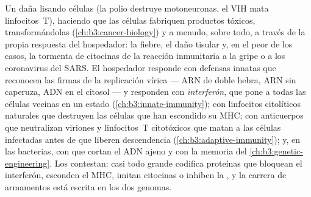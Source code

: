 \begin{proposition}\label{prop:b3:virology:pathogenesis}
Un  daña lisando células (la polio destruye motoneuronas, el VIH
mata linfocitos~T), haciendo que las células fabriquen productos tóxicos,
transformándolas (\cref{ch:b3:cancer-biology}) y a menudo, sobre todo, a
través de la propia respuesta del hospedador: la fiebre, el daño tisular
y, en el peor de los casos, la tormenta de citocinas de la reacción
inmunitaria a la gripe o a los coronavirus del SARS. El hospedador
responde con defensas innatas que reconocen las firmas de la replicación
vírica --- ARN de doble hebra, ARN sin caperuza, ADN en el citosol --- y
responden con \emph{interferón}, que pone a todas las células vecinas en
un estado  (\cref{ch:b3:innate-immunity}); con linfocitos
citolíticos naturales que destruyen las células que han escondido su MHC;
con anticuerpos que neutralizan viriones y linfocitos~T citotóxicos que
matan a las células infectadas antes de que liberen descendencia
(\cref{ch:b3:adaptive-immunity}); y, en las bacterias, con  que cortan el ADN ajeno y con la memoria  del
\cref{ch:b3:genetic-engineering}. Los  contestan: casi todo 
grande codifica proteínas que bloquean el interferón, esconden el MHC,
imitan citocinas o inhiben la , y la carrera de armamentos está
escrita en los dos genomas.
\end{proposition}

